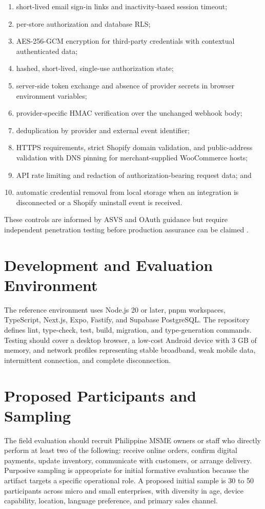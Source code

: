 \documentclass[12pt,oneside]{report}
\begin{document}
\begin{enumerate}
  \item short-lived email sign-in links and inactivity-based session timeout;
  \item per-store authorization and database RLS;
  \item AES-256-GCM encryption for third-party credentials with contextual
  authenticated data;
  \item hashed, short-lived, single-use authorization state;
  \item server-side token exchange and absence of provider secrets in browser
  environment variables;
  \item provider-specific HMAC verification over the unchanged webhook body;
  \item deduplication by provider and external event identifier;
  \item HTTPS requirements, strict Shopify domain validation, and public-address
  validation with DNS pinning for merchant-supplied WooCommerce hosts;
  \item API rate limiting and redaction of authorization-bearing request data;
  and
  \item automatic credential removal from local storage when an integration is
  disconnected or a Shopify uninstall event is received.
\end{enumerate}

These controls are informed by ASVS and OAuth guidance but require independent
penetration testing before production assurance can be claimed
\parencite{owasp2025asvs,rfc9700oauth}.

\section{Development and Evaluation Environment}
The reference environment uses Node.js 20 or later, pnpm workspaces,
TypeScript, Next.js, Expo, Fastify, and Supabase PostgreSQL. The repository
defines lint, type-check, test, build, migration, and type-generation commands.
Testing should cover a desktop browser, a low-cost Android device with 3 GB of
memory, and network profiles representing stable broadband, weak mobile data,
intermittent connection, and complete disconnection.

\section{Proposed Participants and Sampling}
The field evaluation should recruit Philippine MSME owners or staff who directly
perform at least two of the following: receive online orders, confirm digital
payments, update inventory, communicate with customers, or arrange delivery.
Purposive sampling is appropriate for initial formative evaluation because the
artifact targets a specific operational role. A proposed initial sample is 30
to 50 participants across micro and small enterprises, with diversity in age,
device capability, location, language preference, and primary sales channel.
\end{document}
